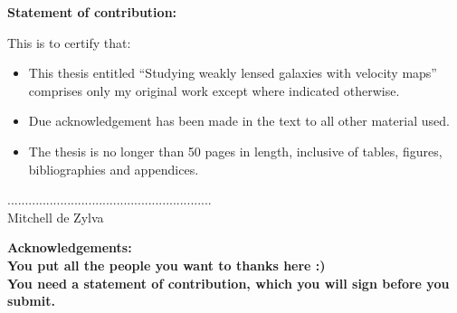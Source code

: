 


\bfseries{Statement of contribution:}\mdseries\\
\vspace{1.0cm}

This is to certify that:\\

\begin{itemize}

\item This thesis entitled ``Studying weakly lensed galaxies
with velocity maps'' comprises only my original work except where indicated otherwise.

\item Due acknowledgement has been made in the text to all other material used.

\item The thesis is no longer than 50 pages in length, inclusive of tables, figures, bibliographies and
appendices.

\end{itemize}

\vspace{4.0cm}


\scriptsize{..........................................................}\normalsize\\
\newline
\vspace{3.0cm}
\indent Mitchell de Zylva\\
      					 
\vspace{2.0cm}

\bfseries{Acknowledgements:}\mdseries\\

You put all the people you want to thanks here :)\\

You need a statement of contribution, which you will sign before you submit. 